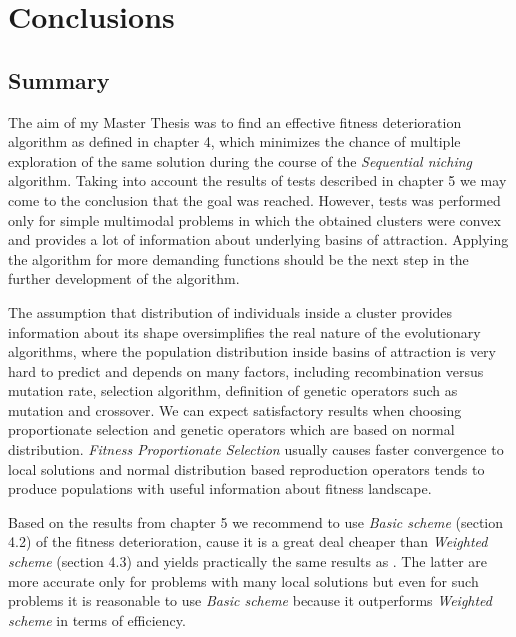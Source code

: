 
\chapter{Conclusions}
\label{Conclusions}

\section{Summary}
The aim of my Master Thesis was to find an effective fitness deterioration
algorithm as defined in chapter 4, which minimizes the chance of multiple
exploration of the same solution during the course of the \textit{Sequential
niching} algorithm. Taking into account the results of tests described in
chapter 5 we may come to the conclusion that the goal was reached. However,
tests was performed only for simple
multimodal problems in which the obtained clusters were convex and provides 
a lot of information about underlying basins of attraction. Applying the
algorithm for more demanding functions should be the next step in the further
development of the algorithm.  

The assumption that distribution of individuals inside a cluster provides
information about its shape oversimplifies the real nature of the evolutionary
algorithms, where the population distribution inside basins of attraction is 
very hard to predict and depends on many factors, including recombination versus
mutation rate, selection algorithm, definition of genetic operators such as
mutation and crossover. We can expect satisfactory results when
choosing proportionate selection and genetic operators which are based on normal
distribution. \textit{Fitness Proportionate Selection} usually causes faster
convergence to local solutions and normal distribution based reproduction operators tends 
to produce populations with useful information about fitness landscape.

Based on the results from chapter 5 we recommend to use \textit{Basic scheme}
(section 4.2) of the fitness deterioration, cause it is a great deal cheaper
than \textit{Weighted scheme} (section 4.3) and yields practically the
same results as . The latter are more
accurate only for problems with many local solutions but even for such problems it is reasonable to use \textit{Basic scheme}
because it outperforms \textit{Weighted scheme} in terms of efficiency. 


